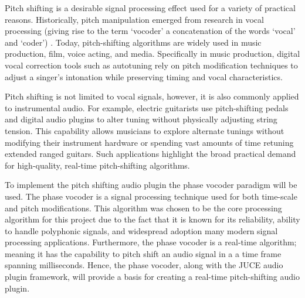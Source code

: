 \documentclass[12pt]{article}
\begin{document}
Pitch shifting is a desirable signal processing effect used for a variety of practical reasons. 
Historically, pitch manipulation emerged from research in vocal processing 
(giving rise to the term `vocoder' a concatenation of the words `vocal' and `coder') \cite{dolson1986phase}. 
Today, pitch-shifting algorithms are widely used in music production, film, 
voice acting, and media. Specifically in music production,  
digital vocal correction tools such as autotuning rely on pitch 
modification techniques to adjust a singer's intonation while preserving 
timing and vocal characteristics.

Pitch shifting is not limited to vocal signals, however, it is also commonly applied 
to instrumental audio. For example, electric guitarists use pitch-shifting %
pedals and digital audio plugins to alter tuning without physically adjusting 
string tension. This capability allows musicians to explore alternate tunings
without modifying their instrument hardware or spending vast amounts of time retuning extended ranged guitars. 
Such applications highlight the broad practical demand for high-quality, 
real-time pitch-shifting algorithms.

To implement the pitch shifting audio plugin the phase vocoder paradigm will be used. 
The phase vocoder is a signal processing technique used for both time-scale and pitch modifications.
This algorithm was chosen to be the core processing algorithm for this project due to the fact that
it is known for its reliability, ability to handle polyphonic signals, 
and widespread adoption many modern signal processing applications. Furthermore, the phase vocoder
is a real-time algorithm; meaning it has the capability to pitch shift an audio signal in a a time frame spanning
milliseconds. Hence, the phase vocoder, along with the JUCE audio plugin framework, will provide a basis for creating 
a real-time pitch-shifting audio plugin. 
\end{document}

